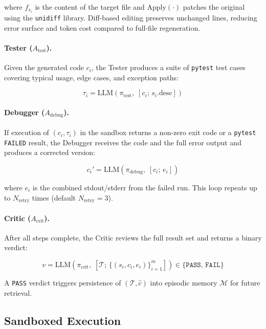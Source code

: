 \documentclass[journal]{IEEEtran}
\begin{document}
\noindent where $f_{s_i}$ is the content of the target file and $\text{Apply}(\cdot)$ patches the original using the \texttt{unidiff} library. Diff-based editing preserves unchanged lines, reducing error surface and token cost compared to full-file regeneration.

\paragraph{Tester ($A_\text{test}$).}
Given the generated code $c_i$, the Tester produces a suite of \texttt{pytest} test cases covering typical usage, edge cases, and exception paths:

\begin{equation}
  \tau_i = \text{LLM}(\pi_\text{test},\;
           [c_i;\, s_i.\text{desc}])
\end{equation}

\paragraph{Debugger ($A_\text{debug}$).}
If execution of $(c_i, \tau_i)$ in the sandbox returns a non-zero exit code or a \texttt{pytest} \texttt{FAILED} result, the Debugger receives the code and the full error output and produces a corrected version:

\begin{equation}
  c_i' = \text{LLM}(\pi_\text{debug},\; [c_i;\, e_i])
\end{equation}

\noindent where $e_i$ is the combined stdout/stderr from the failed run. This loop repeats up to $N_\text{retry}$ times (default $N_\text{retry} = 3$).

\paragraph{Critic ($A_\text{crit}$).}
After all steps complete, the Critic reviews the full result set and returns a binary verdict:

\begin{equation}
  v = \text{LLM}(\pi_\text{crit},\;
      [\mathcal{T};\, \{(s_i, c_i, e_i)\}_{i=1}^m])
      \in \{\texttt{PASS},\, \texttt{FAIL}\}
\end{equation}

\noindent A \texttt{PASS} verdict triggers persistence of $(\mathcal{T}, \hat{c})$ into episodic memory $\mathcal{M}$ for future retrieval.

\subsection{Sandboxed Execution}
\label{sec:sandbox}
\end{document}
